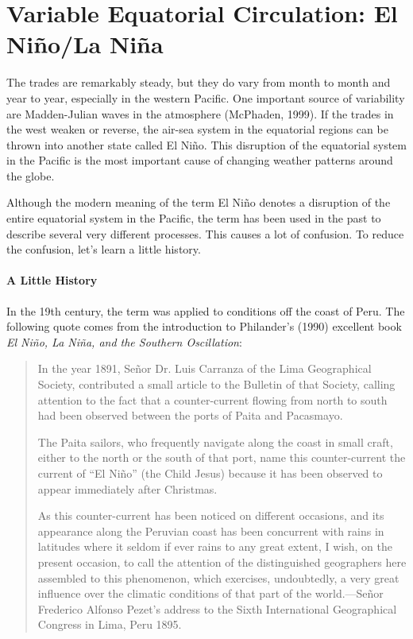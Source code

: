 \section[El Ni\~{n}o]{Variable Equatorial Circulation: El Ni\~{n}o/La
Ni\~{n}a} The trades are remarkably steady, but they do
vary from month to month and year to year, especially in the western
Pacific. One important source of variability are Madden-Julian waves
in the atmosphere (McPhaden, 1999). If the trades in the west weaken
or reverse, the air-sea system in the equatorial regions can be thrown
into another state called El Ni\~{n}o. This disruption of the
equatorial system in the Pacific is the most important cause of
changing weather patterns around the globe.

Although the modern meaning of the term El Ni\~{n}o denotes a
disruption of the entire equatorial system in the Pacific, the term
has been used in the past to describe several very different
processes. This causes a lot of confusion. To reduce the confusion,
let's learn a little history.

\paragraph{A Little History}
In the 19th century, the term was applied to conditions off the coast
of Peru. The following quote comes from the introduction to
Philander's (1990) excellent book \textit{El Ni\~{n}o, La Ni\~{n}a,
  and the Southern Oscillation}:
\begin{quotation} \small
In the year 1891, Se\~{n}or Dr. Luis Carranza of the Lima Geographical
Society, contributed a small article to the Bulletin of that Society,
calling attention to the fact that a counter-current flowing from
north to south had been observed between the ports of Paita and
Pacasmayo.

The Paita sailors, who frequently navigate along the coast in small
craft, either to the north or the south of that port, name this
counter-current the current of ``El Ni\~{n}o'' (the Child Jesus)
because it has been observed to appear immediately after Christmas.

As this counter-current has been noticed on different occasions, and
its appearance along the Peruvian coast has been concurrent with rains
in latitudes where it seldom if ever rains to any great extent, I
wish, on the present occasion, to call the attention of the
distinguished geographers here assembled to this phenomenon, which
exercises, undoubtedly, a very great influence over the climatic
conditions of that part of the world.---Se\~{n}or Frederico Alfonso
Pezet's address to the Sixth International Geographical Congress in
Lima, Peru 1895.
\end{quotation}

